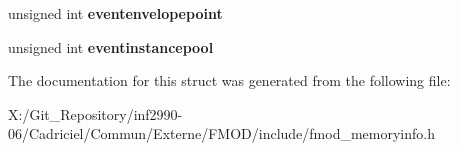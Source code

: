 \begin{DoxyCompactItemize}
\item 
\hypertarget{struct_f_m_o_d___m_e_m_o_r_y___u_s_a_g_e___d_e_t_a_i_l_s_aeec51fe4108d9f383c5db076dcac34be}{unsigned int {\bfseries eventenvelopepoint}}\label{struct_f_m_o_d___m_e_m_o_r_y___u_s_a_g_e___d_e_t_a_i_l_s_aeec51fe4108d9f383c5db076dcac34be}

\item 
\hypertarget{struct_f_m_o_d___m_e_m_o_r_y___u_s_a_g_e___d_e_t_a_i_l_s_ac75baf7e2a3500aeab9a968276fa010c}{unsigned int {\bfseries eventinstancepool}}\label{struct_f_m_o_d___m_e_m_o_r_y___u_s_a_g_e___d_e_t_a_i_l_s_ac75baf7e2a3500aeab9a968276fa010c}

\end{DoxyCompactItemize}


The documentation for this struct was generated from the following file\-:\begin{DoxyCompactItemize}
\item 
X\-:/\-Git\-\_\-\-Repository/inf2990-\/06/\-Cadriciel/\-Commun/\-Externe/\-F\-M\-O\-D/include/fmod\-\_\-memoryinfo.\-h\end{DoxyCompactItemize}
